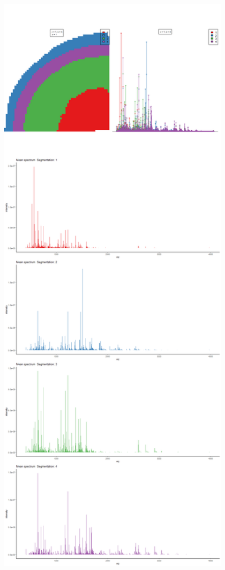 \documentclass[
]{article}
\begin{document}
\includegraphics[width=14.22in]{README_files/figure-latex/VisulazeKmean-1}
\end{document}
